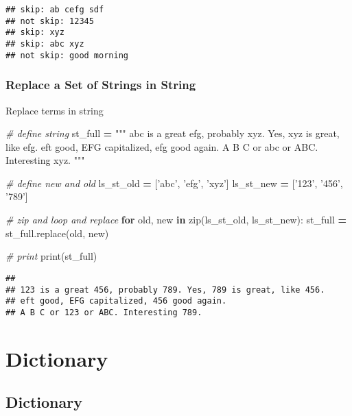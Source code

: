 \documentclass[
]{book}
\newenvironment{Shaded}{\begin{snugshade}}{\end{snugshade}}
\newcommand{\BuiltInTok}[1]{#1}
\newcommand{\CommentTok}[1]{\textcolor[rgb]{0.56,0.35,0.01}{\textit{#1}}}
\newcommand{\ControlFlowTok}[1]{\textcolor[rgb]{0.13,0.29,0.53}{\textbf{#1}}}
\newcommand{\KeywordTok}[1]{\textcolor[rgb]{0.13,0.29,0.53}{\textbf{#1}}}
\newcommand{\NormalTok}[1]{#1}
\newcommand{\OperatorTok}[1]{\textcolor[rgb]{0.81,0.36,0.00}{\textbf{#1}}}
\newcommand{\StringTok}[1]{\textcolor[rgb]{0.31,0.60,0.02}{#1}}
\begin{document}
\begin{verbatim}
## skip: ab cefg sdf
## not skip: 12345
## skip: xyz
## skip: abc xyz
## not skip: good morning
\end{verbatim}

\hypertarget{replace-a-set-of-strings-in-string}{%
\subsubsection{Replace a Set of Strings in String}\label{replace-a-set-of-strings-in-string}}

Replace terms in string

\begin{Shaded}
\begin{Highlighting}[]
\CommentTok{# define string}
\NormalTok{st_full }\OperatorTok{=} \StringTok{"""}
\StringTok{abc is a great efg, probably xyz. Yes, xyz is great, like efg. }
\StringTok{eft good, EFG capitalized, efg good again. }
\StringTok{A B C or abc or ABC. Interesting xyz. }
\StringTok{"""}

\CommentTok{# define new and old}
\NormalTok{ls_st_old }\OperatorTok{=}\NormalTok{ [}\StringTok{'abc'}\NormalTok{, }\StringTok{'efg'}\NormalTok{, }\StringTok{'xyz'}\NormalTok{]}
\NormalTok{ls_st_new }\OperatorTok{=}\NormalTok{ [}\StringTok{'123'}\NormalTok{, }\StringTok{'456'}\NormalTok{, }\StringTok{'789'}\NormalTok{]}

\CommentTok{# zip and loop and replace}
\ControlFlowTok{for}\NormalTok{ old, new }\KeywordTok{in} \BuiltInTok{zip}\NormalTok{(ls_st_old, ls_st_new):}
\NormalTok{  st_full }\OperatorTok{=}\NormalTok{ st_full.replace(old, new)}

\CommentTok{# print}
\BuiltInTok{print}\NormalTok{(st_full)}
\end{Highlighting}
\end{Shaded}

\begin{verbatim}
## 
## 123 is a great 456, probably 789. Yes, 789 is great, like 456. 
## eft good, EFG capitalized, 456 good again. 
## A B C or 123 or ABC. Interesting 789.
\end{verbatim}

\hypertarget{dictionary}{%
\section{Dictionary}\label{dictionary}}

\hypertarget{dictionary-1}{%
\subsection{Dictionary}\label{dictionary-1}}
\end{document}

